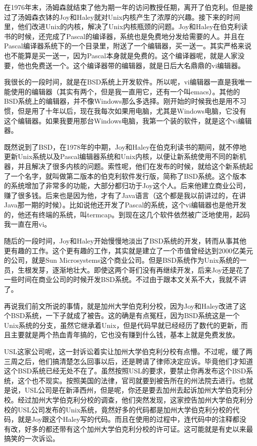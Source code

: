 \documentclass[
  letterpaper,
  DIV=11,
  numbers=noendperiod]{scrreprt}
\begin{document}
在1976年末，汤姆森就结束了他为期一年的访问教授任期，离开了伯克利。但是接过了汤姆森衣钵的Joy和Haley就对Unix内核产生了浓厚的兴趣。接下来的时间里，他们改进Unix的内核，解决了Unix内核瓶颈的问题。Joy和Haley在伯克利读书的时候，还完成了Pascal的编译器，系统也是免费地分发给需要的人。并且在Pascal编译器系统下的一个目录里，附送了一个编辑器，买一送一。其实严格来说也不能算是买一送一，因为Pascal本身就是免费的。这个编译器呢，就是人家没要，他也免费送一个。这个编译器带的编辑器，就是日后大名鼎鼎的vi编辑器。

我很长的一段时间，就是在BSD系统上开发软件。所以呢，vi编辑器一直是我唯一能使用的编辑器（其实有两个，但是我一直用它，还有一个叫emacs）。其他的BSD系统上的编辑器，并不像Windows那么多选择。刚开始的时候我也是用不习惯，但是用了十年以后，现在我每次如果用电脑，尤其是Windows电脑，它没有这个编辑器。如果我要用那台Windows电脑，我第一个装的软件，就是这个vi编辑器。

既然说到了BSD，在1978年的中期，Joy和Haley在伯克利读书的期间，就不停地更新Unix系统以及Pascal编辑器系统和Unix内核，以便让新系统使用不同的新机器，并且解决了很多内核的问题。索性呢，他们在发布的时候，就给这个新系统起了一个名字，就叫做第二版本的伯克利软件发行版，简称了BSD系统。这个版本的系统增加了非常多的功能，大部分都归功于Joy这个人。后来他建立商业公司，赚了很多钱。后来也是因为他，才有了Java语言（这个都是我以前讲过的，在讲Java那一期的时候）。比如说他还开发了Pascal的系统，这个vi编辑器也是他开发的，他还有终端的系统，叫termcap。到现在这几个软件依然被广泛地使用，起码我一直在用vi。

随后的一段时间，Joy和Haley开始慢慢地淡出了BSD系统的开发，转而从事其他更有趣的工作。这个更有趣的工作，其实就是建立了一个市值曾经达到2000亿美元的公司，就是Sun
Microsystems这个商业公司。但是BSD系统作为Unix系统的一员，生根发芽，逐渐地壮大。即使这两个哥们没有再继续开发，后来Joy还是花了一些时间在商业公司的时候开发BSD系统。不过由于跟本文关系不大，我就不讲了。

再说我们前文所说的事情，就是加州大学伯克利分校，因为Joy和Haley改进了这个BSD系统，一下子就成了被告。这的确是有点冤枉，因为BSD系统这是一个Unix系统的分支，虽然它继承着Unix，但是代码早就已经经历了数代的更新，而且主要就是两个热血青年搞的，它也没有赚到什么钱，基本上就是免费发放。

USL这家公司呢，这一封诉讼着实让加州大学伯克利分校有点懵。不过呢，缓了两三周之后，他们搞清楚怎么回事以后，还是聘请了律师决定应诉。毕竟他们才知道这个BSD系统已经无处不在了。虽然按照USL的要求，要禁止你再发布这个BSD系统，这个也不现实。按照美国的法律，官司就要到被告所在的州法院去进行。也就是说，USL公司是在新泽西州，但是呢，你还是要去加州去起诉加州大学伯克利分校。经过加州大学伯克利分校的调查，他们突然发现，这家控告加州大学伯克利分校的USL公司发布的Unix系统，竟然好多的代码都是加州大学伯克利分校的代码，就是Joy跟这个Haley写的代码。而且在使用的过程中，连代码中的注释都没有改，好多的都还带有这个加州大学伯克利分校的许可证。这可能就是有史以来最搞笑的一次诉讼。
\end{document}
